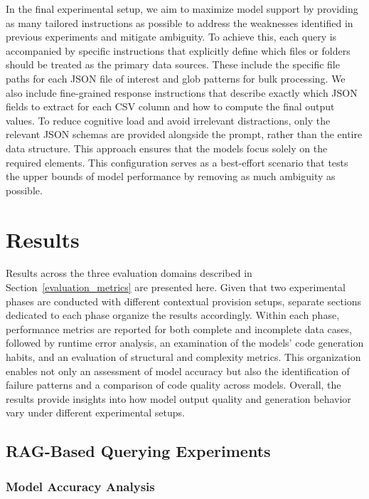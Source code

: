 \documentclass{DESSThesis}
\begin{document}
\noindent In the final experimental setup, we aim to maximize model support by providing as many tailored instructions as possible to address the weaknesses identified in previous experiments and mitigate ambiguity. To achieve this, each query is accompanied by specific instructions that explicitly define which files or folders should be treated as the primary data sources. These include the specific file paths for each JSON file of interest and glob patterns for bulk processing. We also include fine-grained response instructions that describe exactly which JSON fields to extract for each CSV column and how to compute the final output values. To reduce cognitive load and avoid irrelevant distractions, only the relevant JSON schemas are provided alongside the prompt, rather than the entire data structure. This approach ensures that the models focus solely on the required elements. This configuration serves as a best-effort scenario that tests the upper bounds of model performance by removing as much ambiguity as possible.

\chapter{Results} \label{chap:results}

Results across the three evaluation domains described in Section~\ref{evaluation_metrics} are presented here. Given that two experimental phases are conducted with different contextual provision setups, separate sections dedicated to each phase organize the results accordingly. Within each phase, performance metrics are reported for both complete and incomplete data cases, followed by runtime error analysis, an examination of the models' code generation habits, and an evaluation of structural and complexity metrics. This organization enables not only an assessment of model accuracy but also the identification of failure patterns and a comparison of code quality across models. Overall, the results provide insights into how model output quality and generation behavior vary under different experimental setups.

\section{RAG-Based Querying Experiments}

\subsection{Model Accuracy Analysis} \label{RAG_accuracy_analysis}
\end{document}
